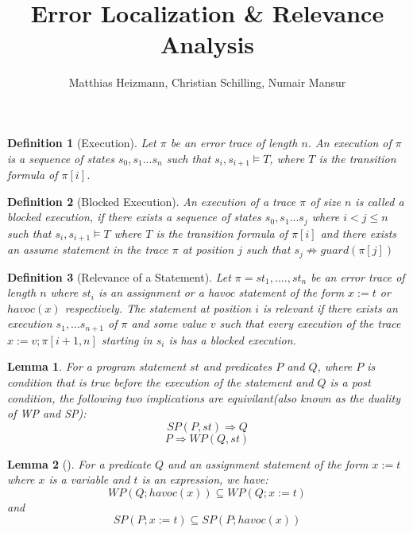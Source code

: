 \documentclass{article}
\title{Error Localization \& Relevance Analysis \\ }
\author{Matthias Heizmann, Christian Schilling, Numair Mansur}
\affil{University of Freiburg, Germany}
\date{\vspace{-5ex}}
\newcommand{\limp}{\Rightarrow}
\newtheorem{mydef}{Definition}
\newtheorem{lemma}{Lemma}
\begin{document}
\begin{mydef}[Execution]\label{mydef:execution}
Let $\pi$ be an error trace of length $n$. An execution of $\pi$ is a sequence of states $s_0, s_1 ... s_n$ such that $s_i, s_{i+1} \vDash T$, where $T$ is the transition formula of $\pi[i]$.
\end{mydef}
\begin{mydef}[Blocked Execution]\label{mydef:blocked_execution}
An execution of a trace $\pi$ of size $n$ is called a blocked execution, if there exists a sequence of states $s_0,s_1...s_j$ where $i<j \leq n$ such that $s_i, s_{i+1} \vDash T$ where $T$ is the transition formula of $\pi[i]$ and there exists an assume statement in the trace $\pi$ at position $j$ such that $s_j \not \limp guard(\pi[j])$
\end{mydef}

\begin{mydef}[Relevance of a Statement]\label{mydef:responsible}
Let $\pi = st_1,....,st_n$ be an error trace of length $n$ where $st_i$ is an assignment or a havoc statement of the form $x:=t$ or $havoc(x)$ respectively. The statement at position $i$ is relevant if there exists an execution $s_1,...s_{n+1}$ of $\pi$ and some value $v$ such that every execution of the trace $x:=v; \pi[i+1,n]$ starting in $s_i$ is has a blocked execution.
\end{mydef}

\begin{lemma}\label{lemma:duality}
For a program statement $st$ and predicates $P$ and $Q$, where $P$ is condition that is true before the execution of the statement and $Q$ is a post condition, the following two implications are equivilant(also known as the duality of WP and SP):
$$SP(P,st) \Rightarrow Q$$
$$P \Rightarrow WP(Q,st)$$
\end{lemma}

\begin{lemma}[]\label{lemma:rel_bw_assignment_and_havoc}
For a predicate $Q$ and an assignment statement of the form $x:=t$ where $x$ is a variable and $t$ is an expression, we have:
$$WP(Q; havoc(x)) \subseteq WP(Q; x:=t)$$
and
$$SP(P;x:=t) \subseteq SP(P;havoc(x))$$
\end{lemma}
\end{document}
